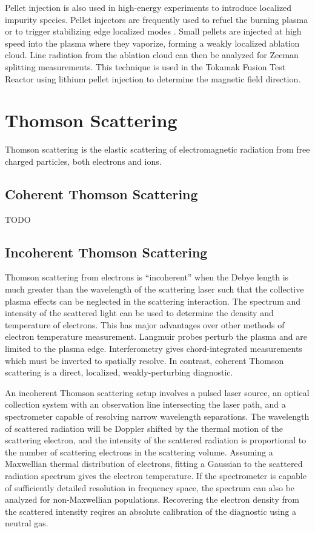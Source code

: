 \documentclass{jpp}
\begin{document}
Pellet injection is also used in high-energy experiments to introduce localized impurity species. Pellet injectors are frequently used to refuel the burning plasma or to trigger stabilizing edge localized modes \citep{BaylorL.R2015Emwp}. Small pellets are injected at high speed into the plasma where they vaporize, forming a weakly localized ablation cloud. Line radiation from the ablation cloud can then be analyzed for Zeeman splitting measurements. This technique is used in the Tokamak Fusion Test Reactor \citep{doi:10.1063/1.1141775} using lithium pellet injection to determine the magnetic field direction.

\section{Thomson Scattering}

Thomson scattering is the elastic scattering of electromagnetic radiation from free charged particles, both electrons and ions. 

\subsection{Coherent Thomson Scattering}

{\Large TODO \par}

\subsection{Incoherent Thomson Scattering}

Thomson scattering from electrons is ``incoherent'' when the Debye length is much greater than the wavelength of the scattering laser such that the collective plasma effects can be neglected in the scattering interaction. The spectrum and intensity of the scattered light can be used to determine the density and temperature of electrons. This has major advantages over other methods of electron temperature measurement. Langmuir probes perturb the plasma and are limited to the plasma edge. Interferometry gives chord-integrated measurements which must be inverted to spatially resolve. In contrast, coherent Thomson scattering is a direct, localized, weakly-perturbing diagnostic.

An incoherent Thomson scattering setup involves a pulsed laser source, an optical collection system with an observation line intersecting the laser path, and a spectrometer capable of resolving narrow wavelength separations. The wavelength of scattered radiation will be Doppler shifted by the thermal motion of the scattering electron, and the intensity of the scattered radiation is proportional to the number of scattering electrons in the scattering volume. Assuming a Maxwellian thermal distribution of electrons, fitting a Gaussian to the scattered radiation spectrum gives the electron temperature. If the spectrometer is capable of sufficiently detailed resolution in frequency space, the spectrum can also be analyzed for non-Maxwellian populations. Recovering the electron density from the scattered intensity reqires an absolute calibration of the diagnostic using a neutral gas.
\end{document}
